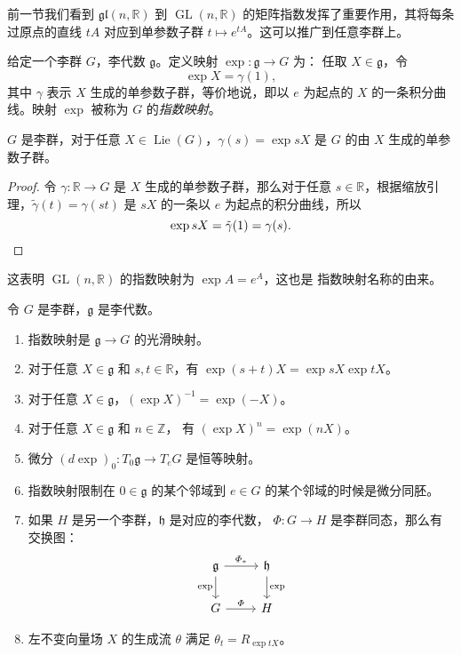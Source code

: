 \documentclass[fontset=none]{Notes}
\DeclareMathOperator\GL{GL}
\DeclareMathOperator\Lie{Lie}
\newcommand{\lie}[1]{\mathfrak{#1}}
\begin{document}
前一节我们看到 $\lie{gl}(n,\mathbb{R})$ 到 $\GL(n,\mathbb{R})$
的矩阵指数发挥了重要作用，其将每条过原点的直线 $tA$ 对应到单参数子群
$t\mapsto e^{tA}$。这可以推广到任意李群上。

给定一个李群 $G$，李代数 $\lie g$。定义映射 $\exp:\lie g\to G$ 为：
任取 $X\in \lie g$，令
\[
  \exp X=\gamma(1),  
\]
其中 $\gamma$ 表示 $X$ 生成的单参数子群，等价地说，即以 $e$ 为起点的
$X$ 的一条积分曲线。映射 $\exp$ 被称为 $G$ 的\emph{指数映射}。

\begin{proposition}
  $G$ 是李群，对于任意 $X\in\Lie(G)$，$\gamma(s)=\exp sX$ 是
  $G$ 的由 $X$ 生成的单参数子群。
\end{proposition}
\begin{proof}
  令 $\gamma:\mathbb{R}\to G$ 是 $X$ 生成的单参数子群，那么对于任意
  $s\in \mathbb{R}$，根据缩放引理，$\tilde{\gamma}(t)=\gamma(st)$
  是 $sX$ 的一条以 $e$ 为起点的积分曲线，所以
  \[
    \exp sX=\tilde{\gamma}(1)=\gamma(s).\qedhere  
  \]
\end{proof}

\begin{example}
  这表明 $\GL(n,\mathbb{R})$ 的指数映射为 $\exp A=e^A$，这也是
  指数映射名称的由来。
\end{example}

\begin{proposition}[指数映射的性质]
  令 $G$ 是李群，$\lie g$ 是李代数。
  \begin{enumerate}
    \item 指数映射是 $\lie g\to G$ 的光滑映射。
    \item 对于任意 $X\in\lie g$ 和 $s,t\in \mathbb{R}$，有
    $\exp(s+t)X=\exp sX \exp tX$。
    \item 对于任意 $X\in\lie g$，$(\exp X)^{-1}=\exp(-X)$。
    \item 对于任意 $X\in\lie g$ 和 $n\in \mathbb{Z}$，
    有 $(\exp X)^n=\exp(nX)$。
    \item 微分 $(d\exp)_0:T_0\lie g\to T_eG$ 是恒等映射。
    \item 指数映射限制在 $0\in \lie g$ 的某个邻域到
    $e\in G$ 的某个邻域的时候是微分同胚。
    \item 如果 $H$ 是另一个李群，$\lie h$ 是对应的李代数，
    $\varPhi:G\to H$ 是李群同态，那么有交换图：
    \begin{equation}
      \begin{tikzcd}
        \lie g\arrow[d,"\exp"']\arrow[r,"\varPhi_*"] &\lie h
        \arrow[d,"\exp"] \\
        G\arrow[r,"\varPhi"] & H 
      \end{tikzcd}
    \end{equation}
    \item 左不变向量场 $X$ 的生成流 $\theta$ 满足 
    $\theta_t=R_{\exp tX}$。
  \end{enumerate}  
\end{proposition}

 
\end{document}
